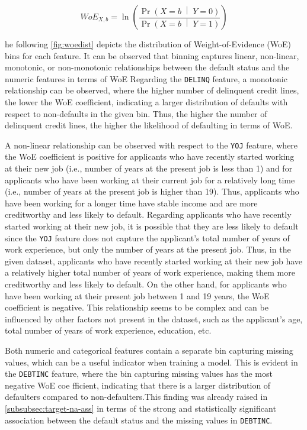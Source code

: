 \begin{equation}\label{eq}
	WoE_{X, b}= \ln \left(\frac{\Pr{\left(X = b\;\middle|\;Y = 0\right)}}{\Pr{\left(X = b\;\middle|\;Y = 1\right)}}\right)
\end{equation}

he following \autoref{fig:woedist} depicts the distribution of Weight-of-Evidence (WoE) bins for each feature. It can be observed that binning captures linear, non-linear, monotonic, or non-monotonic relationships between the default status and the numeric features in terms of WoE
 Regarding the \texttt{DELINQ} feature, a monotonic relationship can be observed, where the higher number of delinquent credit lines, the lower the WoE coefficient, indicating a larger distribution of defaults with respect to non-defaults in the given bin.
 Thus, the higher the number of delinquent credit lines, the higher the likelihood of defaulting in terms of WoE.

 A non-linear relationship can be observed with respect to the \texttt{YOJ} feature, where the WoE coefficient is positive for applicants who have recently started working at their new job (i.e., number of years at the present job is less than 1) and for applicants who have been working at their current job for a relatively long time (i.e., number of years at the present job is higher than 19).
 Thus, applicants who have been working for a longer time have stable income and are more creditworthy and less likely to default.
 Regarding applicants who have recently started working at their new job, it is possible that they are less likely to default since the \texttt{YOJ} feature does not capture the applicant's total number of years of work experience, but only the number of years at the present job.
 Thus, in the given dataset, applicants who have recently started working at their new job have a relatively higher total number of years of work experience, making them more creditworthy and less likely to default. On the other hand, for applicants who have been working at their present job between 1 and 19 years, the WoE coefficient is negative.
 This relationship seems to be complex and can be influenced by other factors not present in the dataset, such as the applicant's age, total number of years of work experience, education, etc.

 Both numeric and categorical features contain a separate bin capturing missing values, which can be a useful indicator when training a model. This is evident in the \texttt{DEBTINC} feature, where the bin capturing missing values has the most negative WoE coe
 fficient, indicating that there is a larger distribution of defaulters compared to non-defaulters.This finding was already raised in \autoref{subsubsec:target-na-ass} in terms of the strong and statistically significant association between the default status and the missing values in \texttt{DEBTINC}.

